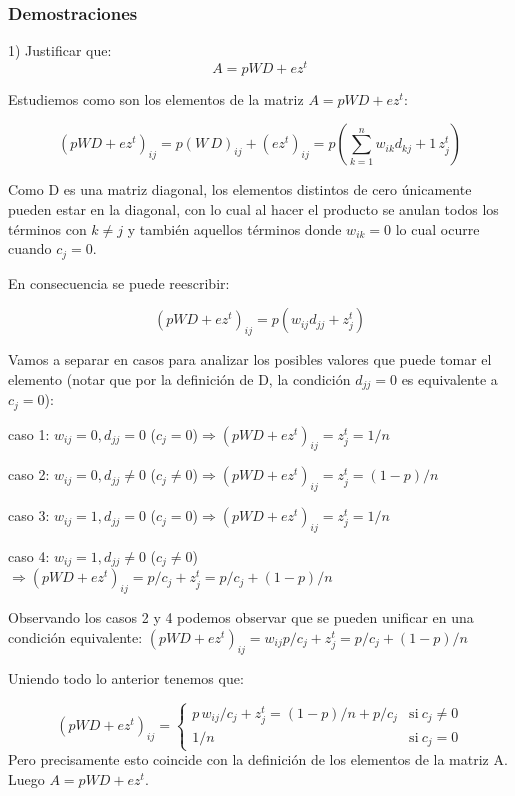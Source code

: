 \subsubsection*{Demostraciones}
\providecommand{\abs}[1]{\lvert#1\rvert}
\providecommand{\norm}[1]{\lVert#1\rVert}

1) Justificar que:
\begin{displaymath}
A = p WD + ez^{t}
\end{displaymath}

Estudiemos como son los elementos de la matriz $A = p WD + ez^{t}$:

\begin{displaymath}
(p WD + ez^{t})_{ij} = p(W\,D)_{ij}+(ez^{t})_{ij} = p(\sum_{k=1}^{n}w_{ik}d_{kj}+1\,z^{t}_j)
\end{displaymath}

Como D es una matriz diagonal, los elementos distintos de cero únicamente pueden estar en la diagonal, con lo cual al hacer el producto se anulan todos los términos con $k\not=j$ y también aquellos términos donde $w_{ik}=0$ lo cual ocurre cuando $c_j=0$.

En consecuencia se puede reescribir:

\begin{displaymath}
(p WD + ez^{t})_{ij} = p(w_{ij}d_{jj}+z^{t}_j)
\end{displaymath}

Vamos a separar en casos para analizar los posibles valores que puede tomar el elemento (notar que por la definición de D, la condición $d_{jj}=0$ es equivalente a $c_j=0$):

caso 1: $w_{ij}=0, d_{jj}=0$ ($c_j=0$)$\Rightarrow(p WD + ez^{t})_{ij} =z_j^t=1/n$


caso 2: $w_{ij}=0, d_{jj}\not=0$ ($c_j\not=0$)$\Rightarrow(p WD + ez^{t})_{ij} =z_j^t=(1-p)/n$


caso 3: $w_{ij}=1, d_{jj}=0$ ($c_j=0$)$\Rightarrow(p WD + ez^{t})_{ij} =z_j^t=1/n$


caso 4: $w_{ij}=1, d_{jj}\not=0$ ($c_j\not=0$)$\Rightarrow(p WD + ez^{t})_{ij} =p/c_j+z_j^t=p/c_j+(1-p)/n$

Observando los casos 2 y 4 podemos observar que se pueden  unificar en una condición equivalente: $(p WD + ez^{t})_{ij} =w_{ij}p/c_j+z_j^t=p/c_j+(1-p)/n$

Uniendo todo lo anterior tenemos que:


\begin{equation}
 (p WD + ez^{t})_{ij} = \left\{
    \begin{array}{ll}
	 p\,w_{ij}/c_j+z_j^t=(1-p)/n+p/c_j & \mathrm{si\ } c_j \not= 0 \\
	 1/n & \mathrm{si\ } c_j=0
	 \end{array}
   \right.
\end{equation}
Pero precisamente esto coincide con la definición de los elementos de la matriz A. Luego $A = p WD + ez^{t}$.

